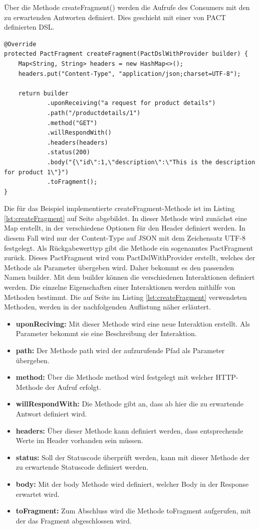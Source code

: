 \documentclass{llncs}
\begin{document}
Über die Methode createFragment() werden die Aufrufe des Consumers mit den zu erwartenden Antworten definiert. Dies geschieht mit einer von PACT definierten DSL.
\lstset{language = Java}
\begin{lstlisting}[caption=Implementierung createFragment(),label=lst:createFragment]
@Override
protected PactFragment createFragment(PactDslWithProvider builder) {
    Map<String, String> headers = new HashMap<>();
    headers.put("Content-Type", "application/json;charset=UTF-8");
        
    return builder
      		.uponReceiving("a request for product details")
            .path("/productdetails/1")
            .method("GET")
            .willRespondWith()
            .headers(headers)
            .status(200)
            .body("{\"id\":1,\"description\":\"This is the description for product 1\"}")
            .toFragment();
}
\end{lstlisting}
Die für das Beispiel implementierte createFragment-Methode ist im Listing \ref{lst:createFragment} auf Seite \pageref{lst:createFragment} abgebildet. In dieser Methode wird zunächst eine Map erstellt, in der verschiedene Optionen für den Header definiert werden. In diesem Fall wird nur der Content-Type auf JSON mit dem Zeichensatz UTF-8 festgelegt. Als Rückgabewerttyp gibt die Methode ein sogenanntes PactFragment zurück. Dieses PactFragment wird vom PactDslWithProvider erstellt, welches der Methode als Parameter übergeben wird. Daher bekommt es den passenden Namen builder. Mit dem builder können die verschiedenen Interaktionen definiert werden. Die einzelne Eigenschaften einer Interaktionen werden mithilfe von Methoden bestimmt. Die auf Seite \pageref{lst:createFragment} im Listing \ref{lst:createFragment} verwendeten Methoden, werden in der nachfolgenden Auflistung näher erläutert. 

\begin{itemize}
\item \textbf{uponReciving: } Mit dieser Methode wird eine neue Interaktion erstellt. Als Parameter bekommt sie eine Beschreibung der Interaktion.
\item \textbf{path: } Der Methode path wird der aufzurufende Pfad als Parameter übergeben.
\item \textbf{method: } Über die Methode method wird festgelegt mit welcher HTTP-Methode der Aufruf erfolgt.
\item \textbf{willRespondWith: } Die Methode gibt an, dass ab hier die zu erwartende Antwort definiert wird.
\item \textbf{headers: } Über dieser Methode kann definiert werden, dass entsprechende Werte im Header vorhanden sein müssen.
\item \textbf{status: } Soll der Statuscode überprüft werden, kann mit dieser Methode der zu erwartende Statuscode definiert werden.
\item \textbf{body: } Mit der body Methode wird definiert, welcher Body in der Response erwartet wird.
\item \textbf{toFragment: } Zum Abschluss wird die Methode toFragment aufgerufen, mit der das Fragment abgeschlossen wird.
\end{itemize}
\end{document}
